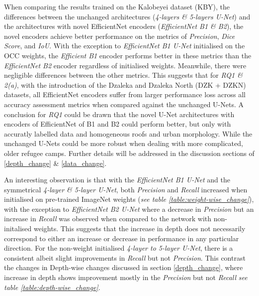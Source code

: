\documentclass[11pt, a4paper, twoside]{report}
\begin{document}
When comparing the results trained on the Kalobeyei dataset (KBY), the differences between the unchanged architectures (\textit{4-layers \& 5-layers U-Net}) and the architectures with novel EfficientNet encoders (\textit{EfficientNet B1 \& B2}), the novel encoders achieve better performance on the metrics of \textit{Precision}, \textit{Dice Score}, and \textit{IoU}. With the exception to \textit{EfficientNet B1 U-Net} initialised on the OCC weights, the \textit{Efficient B1} encoder performs better in these metrics than the \textit{EfficientNet B2} encoder regardless of initialised weights. Meanwhile, there were negligible differences between the other metrics. This suggests that for \textit{RQ1 \& 2(a)}, with the introduction of the Dzaleka and Dzaleka North (DZK + DZKN) datasets, all EfficientNet encoders suffer from larger performance loss across all accuracy assessment metrics when compared against the unchanged U-Nets. A conclusion for \textit{RQ1} could be drawn that the novel U-Net architectures with encoders of EfficientNet of B1 and B2 could perform better, but only with accuratly labelled data and homogeneous roofs and urban morphology. While the unchanged U-Nets could be more robust when dealing with more complicated, older refugee camps. Further details will be addressed in the discussion sections of \ref{depth_change} \& \ref{data_change}.\\\par

An interesting observation is that with the \textit{EfficientNet B1 U-Net} and the symmetrical \textit{4-layer \& 5-layer U-Net}, both \textit{Precision} and \textit{Recall} increased when initialised on pre-trained ImageNet weights (\textit{see table \ref{table:weight-wise_change}}), with the exception to \textit{EfficientNet B2 U-Net} where a decrease in \textit{Precision} but an increase in \textit{Recall} was observed when compared to the network with non-initalised weights. This suggests that the increase in depth does not necessarily correspond to either an increase or decrease in performance in any particular direction. For the non-weight initialised \textit{4-layer to 5-layer U-Net}, there is a consistent albeit slight improvements in \textit{Recall} but not \textit{Precision}. This contrast the changes in Depth-wise changes discussed in section \ref{depth_change}, where increase in depth shows improvement mostly in the \textit{Precision} but not \textit{Recall} \textit{see table \ref{table:depth-wise_change}}.\\\par
\end{document}
